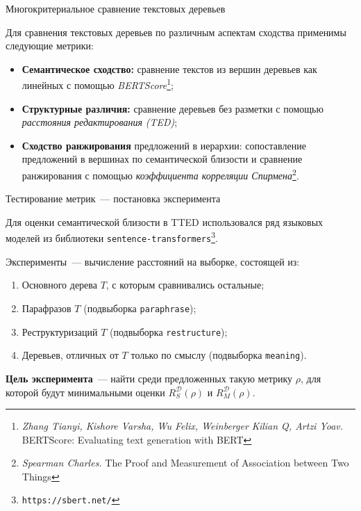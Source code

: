 \documentclass{beamer}
\begin{document}

\begin{frame}{Многокритериальное сравнение текстовых деревьев}

Для сравнения текстовых деревьев по различным аспектам сходства применимы следующие метрики:
\begin{itemize}
    \item \textbf{Семантическое сходство:} сравнение текстов из вершин деревьев как линейных с помощью \textit{BERTScore}\footnote{\textit{Zhang Tianyi, Kishore Varsha, Wu Felix, Weinberger Kilian Q, Artzi Yoav.} BERTScore: Evaluating text generation with BERT};
    \item \textbf{Структурные различия:} сравнение деревьев без разметки с помощью \textit{расстояния редактирования} \textit{(TED)};
    \item \textbf{Сходство ранжирования} предложений в иерархии: сопоставление предложений в вершинах по семантической близости и сравнение ранжирования с помощью \textit{коэффициента корреляции Спирмена}\footnote{\textit{Spearman Charles.} The Proof and Measurement of Association between Two Things}.
\end{itemize}
    
\end{frame}


\begin{frame}{Тестирование метрик~--- постановка эксперимента}

Для оценки семантической близости в TTED использовался ряд языковых моделей из библиотеки \texttt{sentence-transformers}\footnote{\texttt{https://sbert.net/}}. 

Эксперименты~--- вычисление расстояний на выборке, состоящей из:
\begin{enumerate}
    \item Основного дерева $T$, с которым сравнивались остальные;
    \item Парафразов $T$ (подвыборка \texttt{paraphrase});
    \item Реструктуризаций $T$ (подвыборка \texttt{restructure});
    \item Деревьев, отличных от $T$ только по смыслу (подвыборка \texttt{meaning}).
\end{enumerate}
\textbf{Цель эксперимента}~--- найти среди предложенных такую метрику $\rho$, для которой будут минимальными оценки $R_S^\mathcal{D}(\rho)$ и $R_M^\mathcal{D}(\rho)$.

\end{frame}
\end{document}

